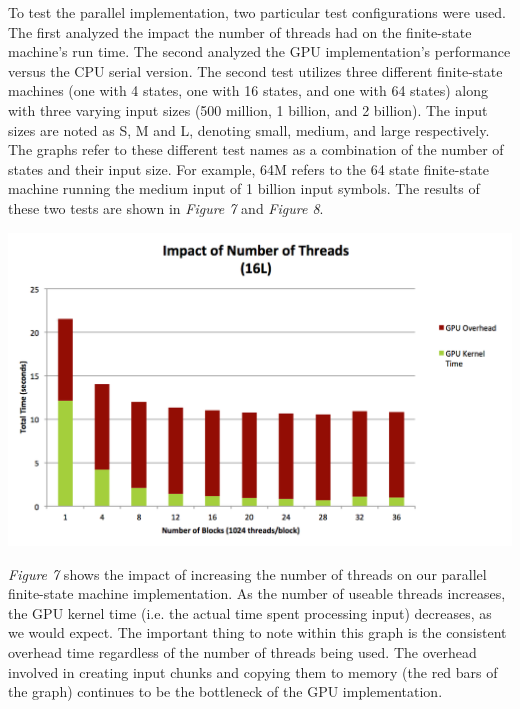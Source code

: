 \documentclass[11pt]{sigplanconf}
\newenvironment{Figure} %
  {\par\medskip\noindent\minipage{\linewidth}}
  {\endminipage\par\medskip}
\begin{document}
To test the parallel implementation, two particular test configurations were used. The first analyzed the impact the number of threads had on the finite-state machine's run time. The second analyzed the GPU implementation's performance versus the CPU serial version. The second test utilizes three different finite-state machines (one with 4 states, one with 16 states, and one with 64 states) along with three varying input sizes (500 million, 1 billion, and 2 billion). The input sizes are noted as S, M and L, denoting small, medium, and large respectively. The graphs refer to these different test names as a combination of the number of states and their input size. For example, 64M refers to the 64 state finite-state machine running the medium input of 1 billion input symbols. The results of these two tests are shown in \textit{Figure 7} and \textit{Figure 8}.

\begin{Figure}
\centering
\includegraphics[width=\linewidth]{impact_of_number_of_threads.png}
\label{fig:Impact of Threads}
\end{Figure}

\textit{Figure 7} shows the impact of increasing the number of threads on our parallel finite-state machine implementation. As the number of useable threads increases, the GPU kernel time (i.e. the actual time spent processing input) decreases, as we would expect. The important thing to note within this graph is the consistent overhead time regardless of the number of threads being used. The overhead involved in creating input chunks and copying them to memory (the red bars of the graph) continues to be the bottleneck of the GPU implementation.
\end{document}
